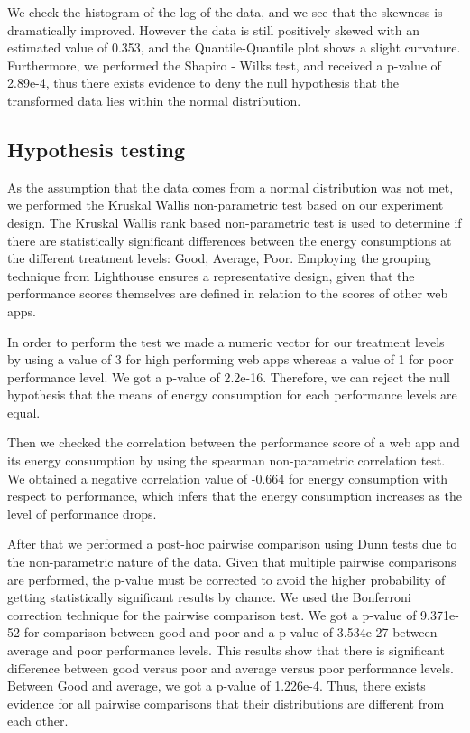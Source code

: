 We check the histogram of the log of the data, and we see that the skewness is dramatically improved. However the data is still positively skewed with an estimated value of 0.353, and the Quantile-Quantile plot shows a slight curvature. Furthermore, we performed the Shapiro - Wilks test, and received a p-value of 2.89e-4, thus there exists evidence to deny the null hypothesis that the transformed data lies within the normal distribution.


\subsection{Hypothesis testing}
As the assumption that the data comes from a normal distribution was not met, we performed the Kruskal Wallis non-parametric test based on our experiment design. 
The Kruskal Wallis rank based non-parametric test is used to determine if there are statistically significant differences between the energy consumptions at the different treatment levels: Good, Average, Poor. Employing the grouping technique from Lighthouse ensures a representative design, given that the performance scores themselves are defined in relation to the scores of other web apps.

In order to perform the test we made a numeric vector for our treatment levels by using a value of 3 for high performing web apps whereas a value of 1 for poor performance level. We got a p-value of 2.2e-16. Therefore, we can reject the null hypothesis that the means of energy consumption for each performance levels are equal.

Then we checked the correlation between the performance score of a web app and its energy consumption by using the spearman non-parametric correlation test. We obtained a negative correlation value of -0.664 for energy consumption with respect to performance, which infers that the energy consumption increases as the level of performance drops. 

After that we performed a post-hoc pairwise comparison using Dunn tests due to the non-parametric nature of the data. Given that multiple pairwise comparisons are performed, the p-value must be corrected to avoid the higher probability of getting statistically significant results by chance.  We used the Bonferroni correction technique for the pairwise comparison test. We got a p-value of 9.371e-52 for comparison between good and poor and a p-value of 3.534e-27 between average and poor performance levels. This results show that  there is significant difference between good versus poor and average versus poor performance levels. Between Good and average, we got a p-value of 1.226e-4.  Thus, there exists evidence for all pairwise comparisons that their distributions are different from each other. 

